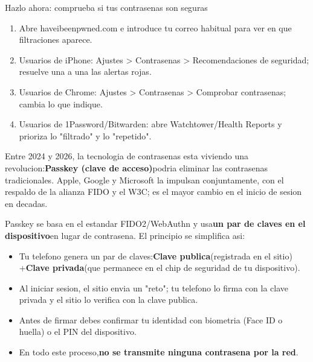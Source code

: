\begin{tcbpractice}{Hazlo ahora: comprueba si tus contrasenas son seguras}
\begin{enumerate}
  \item Abre haveibeenpwned.com e introduce tu correo habitual para ver en que filtraciones aparece.
  \item Usuarios de iPhone: Ajustes > Contrasenas > Recomendaciones de seguridad; resuelve una a una las alertas rojas.
  \item Usuarios de Chrome: Ajustes > Contrasenas > Comprobar contrasenas; cambia lo que indique.
  \item Usuarios de 1Password/Bitwarden: abre Watchtower/Health Reports y prioriza lo "filtrado" y lo "repetido".
\end{enumerate}

\end{tcbpractice}


Entre 2024 y 2026, la tecnologia de contrasenas esta viviendo una revolucion:\textbf{Passkey (clave de acceso)}podria eliminar las contrasenas tradicionales. Apple, Google y Microsoft la impulsan conjuntamente, con el respaldo de la alianza FIDO y el W3C; es el mayor cambio en el inicio de sesion en decadas.


Passkey se basa en el estandar FIDO2/WebAuthn y usa\textbf{un par de claves en el dispositivo}en lugar de contrasena. El principio se simplifica asi:

\begin{itemize}
  \item Tu telefono genera un par de claves:\textbf{Clave publica}(registrada en el sitio) +\textbf{Clave privada}(que permanece en el chip de seguridad de tu dispositivo).
  \item Al iniciar sesion, el sitio envia un "reto"; tu telefono lo firma con la clave privada y el sitio lo verifica con la clave publica.
  \item Antes de firmar debes confirmar tu identidad con biometria (Face ID o huella) o el PIN del dispositivo.
  \item En todo este proceso,\textbf{no se transmite ninguna contrasena por la red}.
\end{itemize}


